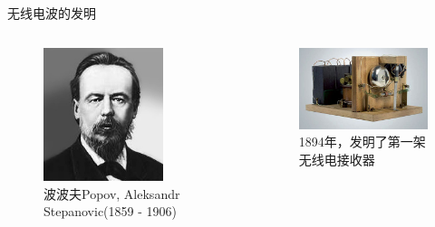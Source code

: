 \documentclass{ctexbeamer}
\begin{document}
\begin{frame}{无线电波的发明}
  \begin{columns}
    \begin{column}{0.35\linewidth}
      \begin{figure}
        \includegraphics[width=3.5cm]{popov.jpg}
        \caption{波波夫Popov, Aleksandr Stepanovic(1859 - 1906)}
      \end{figure}
    \end{column}
    \begin{column}{0.65\linewidth}
      \begin{figure}
        \includegraphics[width=6.5cm]{wirelessreceiver.jpg}
        \caption{1894年，发明了第一架无线电接收器}
      \end{figure}
    \end{column}
  \end{columns}
\end{frame}
\end{document}
